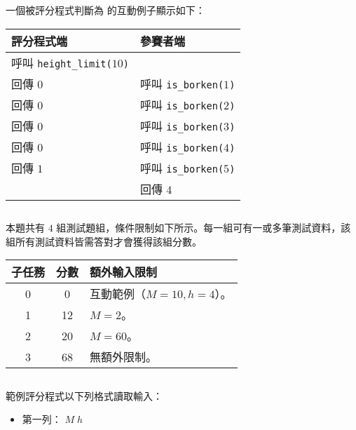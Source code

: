 一個被評分程式判斷為  的互動例子顯示如下：

\begin{center}
    \begin{tabular}[t]{@{}ll@{}}
    \toprule
    評分程式端 & 參賽者端\\
    \midrule
    呼叫 \texttt{height\_limit($10$)} & \\
    回傳 $0$ & 呼叫 \texttt{is\_borken($1$)}\\
    回傳 $0$ & 呼叫 \texttt{is\_borken($2$)}\\
    回傳 $0$ & 呼叫 \texttt{is\_borken($3$)}\\
    回傳 $0$ & 呼叫 \texttt{is\_borken($4$)}\\
    回傳 $1$ & 呼叫 \texttt{is\_borken($5$)}\\
    & 回傳 $4$\\
    \bottomrule
    \end{tabular}
\end{center}

\subsection*{}

本題共有 $4$ 組測試題組，條件限制如下所示。每一組可有一或多筆測試資料，該組所有測試資料皆需答對才會獲得該組分數。

\begin{center}
    \begin{tabular}[t]{@{}ccl@{}}
    \toprule
    子任務 & 分數 & 額外輸入限制\\
    \midrule
    0 & 0  & 互動範例（$M=10, h=4$）。\\
    1 & 12 & $M=2$。\\
    2 & 20 & $M=60$。\\
    3 & 68 & 無額外限制。\\
    \bottomrule
    \end{tabular}
\end{center}

\newpage

\subsection*{}

範例評分程式以下列格式讀取輸入：

\begin{itemize}
    \item 第一列： $M\;h$
\end{itemize}

